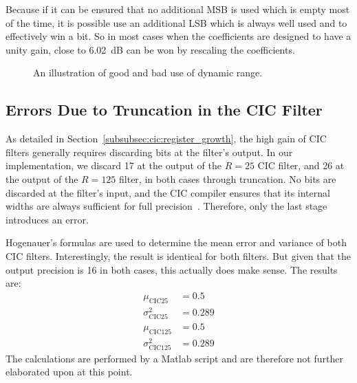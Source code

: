 Because if  it can be ensured  that no additional  MSB is used which  is empty
most of the  time, it is possible  use an additional LSB which  is always well
used and to effectively win a bit. So  in most cases when the coefficients are
designed to have a unity gain, close to \SI{6.02}{\dB} can be won by rescaling
the coefficients.

\begin{figure}
    \centering
    
    \caption{An illustration of good and bad use of dynamic range.}
    \label{fig:fpga:dynamicrange}
\end{figure}

%
%
\subsection{Errors Due to Truncation in the CIC Filter} %
\label{subsec:fpga:errors_in_cic_filter}

As detailed in Section~\ref{subsubsec:cic:register_growth},  the high gain of
CIC filters generally requires discarding  bits at the filter's output. In our
implementation,  we discard  \SI{17}{\bit} at  the  output of  the $R=25$  CIC
filter, and \SI{26}{\bit}  at the output of the $R=125$  filter, in both cases
through  truncation. No bits  are discarded  at  the filter's  input, and  the
CIC  compiler ensures  that  its  internal widths  are  always sufficient  for
full  precision~\cite{xilinx:cic-compiler}. Therefore,  only  the  last  stage
introduces an error.

Hogenauer's formulas are used to determine the mean error and variance of both
CIC  filters. Interestingly, the  result  is identical  for both  filters. But
given that the output precision is  \SI{16}{\bit} in both cases, this actually
does make sense. The results are:
\begin{align}
    \mu_\mathrm{CIC25}       &= 0.5 \label{eq:fpga:cic:mu:cic25}  \\
    \sigma^2_\mathrm{CIC25}  &= 0.289\label{eq:fpga:cic:sigmasq:cic25} \\
    \mu_\mathrm{CIC125}      &= 0.5 \label{eq:fpga:cic:mu:cic125} \\
    \sigma^2_\mathrm{CIC125} &= 0.289\label{eq:fpga:cic:sigmasq:cic125}
\end{align}
The  calculations are  performed  by a  Matlab script  and  are therefore  not
further elaborated upon at this point.

